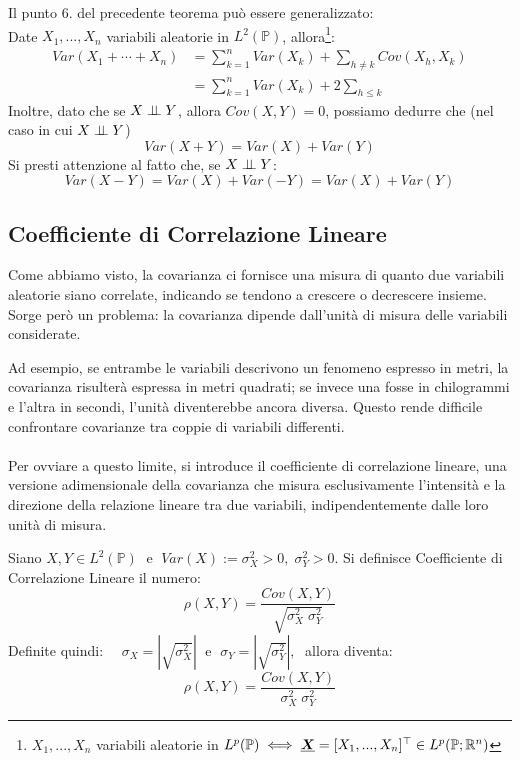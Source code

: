 \noindent Il punto 6. del precedente teorema può essere generalizzato:\\
Date $X_1, ..., X_n$ variabili aleatorie in $L^2(\mathbb{P})$, allora\footnote{$X_1, ..., X_n$ variabili aleatorie in $L^p(\mathbb{P})\iff \underline{{\boldsymbol{X}}}=[X_1, ..., X_n]^\top\in L^p(\mathbb{P};\mathbb{R}^n) $}:
\begin{align*}Var(X_1+\cdots+X_n) & = \sum_{k=1}^n Var(X_k) + \sum_{h\neq k} Cov(X_h, X_k) \\
& = \sum_{k=1}^n Var(X_k) + 2\sum_{h\leq k}\end{align*}
Inoltre, dato che se $X \mathrel{\perp\!\!\!\perp} Y$, allora $Cov(X, Y) = 0$, possiamo dedurre che (nel caso in cui $X\mathrel{\perp\!\!\!\perp} Y$) 
\[Var(X+Y) = Var(X) + Var(Y)\]
Si presti attenzione al fatto che, se $X\mathrel{\perp\!\!\!\perp} Y$:
\[Var(X-Y) = Var(X) + Var(-Y) = Var(X) + Var(Y)\]

\subsection{Coefficiente di Correlazione Lineare}
Come abbiamo visto, la covarianza ci fornisce una misura di quanto due variabili aleatorie siano correlate, indicando se tendono a crescere o decrescere insieme. Sorge però un problema: la covarianza dipende dall’unità di misura delle variabili considerate.

\medskip
Ad esempio, se entrambe le variabili descrivono un fenomeno espresso in metri, la covarianza risulterà espressa in metri quadrati; se invece una fosse in chilogrammi e l’altra in secondi, l’unità diventerebbe ancora diversa. Questo rende difficile confrontare covarianze tra coppie di variabili differenti.\\
\\
Per ovviare a questo limite, si introduce il coefficiente di correlazione lineare, una versione adimensionale della covarianza che misura esclusivamente l’intensità e la direzione della relazione lineare tra due variabili, indipendentemente dalle loro unità di misura.

\begin{definizione}
    Siano $X, Y\in L^2(\mathbb{P})\;$ e $\;Var(X):=\sigma_X^2>0, \;\sigma_Y^2>0$. Si definisce Coefficiente di Correlazione Lineare il numero:
    \[\rho(X, Y) = \frac{Cov(X, Y)}{\sqrt{\sigma_X^2\;\sigma_Y^2}}\]
    Definite quindi: $\quad \sigma_X = \left|\sqrt{\sigma_X^2}\right|\;$ e $\;\sigma_Y = \left|\sqrt{\sigma_Y^2}\right|,\;$ allora diventa:
    \[\rho(X, Y) = \frac{Cov(X, Y)}{\sigma_X^2\;\sigma_Y^2}\]
\end{definizione}


